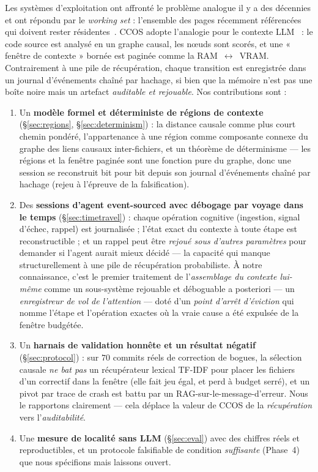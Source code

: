 \documentclass[11pt]{article}
\begin{document}
Les systèmes d'exploitation ont affronté le problème analogue il y a des décennies
et ont répondu par le \emph{working set} : l'ensemble des pages récemment
référencées qui doivent rester résidentes~\cite{denning1968working}. CCOS adopte
l'analogie pour le contexte LLM~\cite{packer2023memgpt} : le code source est analysé
en un graphe causal, les nœuds sont scorés, et une « fenêtre de contexte » bornée est
paginée comme la RAM~$\leftrightarrow$~VRAM. Contrairement à une pile de
récupération, chaque transition est enregistrée dans un journal d'événements chaîné
par hachage, si bien que la mémoire n'est pas une boîte noire mais un artefact
\emph{auditable et rejouable}. Nos contributions sont :

\begin{enumerate}
  \item Un \textbf{modèle formel et déterministe de régions de contexte}
  (\S\ref{sec:regions}, \S\ref{sec:determinism}) : la distance causale comme plus
  court chemin pondéré, l'appartenance à une région comme composante connexe du
  graphe des liens causaux inter-fichiers, et un théorème de déterminisme --- les
  régions et la fenêtre paginée sont une fonction pure du graphe, donc une session
  se reconstruit bit pour bit depuis son journal d'événements chaîné par hachage
  (rejeu à l'épreuve de la falsification).
  \item Des \textbf{sessions d'agent event-sourced avec débogage par voyage dans le
  temps} (\S\ref{sec:timetravel}) : chaque opération cognitive (ingestion, signal
  d'échec, rappel) est journalisée ; l'état exact du contexte à toute étape est
  reconstructible ; et un rappel peut être \emph{rejoué sous d'autres paramètres}
  pour demander si l'agent aurait mieux décidé --- la capacité qui manque
  structurellement à une pile de récupération probabiliste. À notre connaissance,
  c'est le premier traitement de l'\emph{assemblage du contexte lui-même} comme un
  sous-système rejouable et déboguable a posteriori --- un \emph{enregistreur de vol
  de l'attention} --- doté d'un \emph{point d'arrêt d'éviction} qui nomme l'étape et
  l'opération exactes où la vraie cause a été expulsée de la fenêtre budgétée.
  \item Un \textbf{harnais de validation honnête et un résultat négatif}
  (\S\ref{sec:protocol}) : sur $70$ commits réels de correction de bogues, la
  sélection causale \emph{ne bat pas} un récupérateur lexical TF-IDF pour placer les
  fichiers d'un correctif dans la fenêtre (elle fait jeu égal, et perd à budget
  serré), et un pivot par trace de crash est battu par un
  RAG-sur-le-message-d'erreur. Nous le rapportons clairement --- cela déplace la
  valeur de CCOS de la \emph{récupération} vers l'\emph{auditabilité}.
  \item Une \textbf{mesure de localité sans LLM} (\S\ref{sec:eval}) avec des chiffres
  réels et reproductibles, et un protocole falsifiable de condition
  \emph{suffisante} (Phase~4) que nous spécifions mais laissons ouvert.
\end{enumerate}
\end{document}
